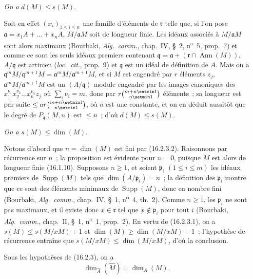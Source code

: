 \begin{env}[16.2.3.3]
\label{0.16.2.3.3-fr}
\emph{On a} $d(M)\leq s(M)$.
\end{env}

Soit en effet $(x_i)_{1\leq i\leq n}$ une famille d'éléments de
$\mathfrak{r}$ telle que, si l'on pose
$\mathfrak{a}=x_1A+\ldots+x_nA$, $M/\mathfrak{a}M$ soit de longueur finie.
Les idéaux associés à $M/\mathfrak{a}M$ sont alors maximaux (Bourbaki,
\emph{Alg.~comm.}, chap.~IV, \S~2, n\textsuperscript{o}~5, prop.~7) et comme ce sont les seuls
idéaux premiers contenant
$\mathfrak{q}=\mathfrak{a}+(\mathfrak{r}\cap\operatorname{Ann}(M))$,
$A/\mathfrak{q}$ est artinien (\emph{loc.~cit.}, prop.~9) et $\mathfrak{q}$
est un idéal de définition de $A$. Mais on a
$\mathfrak{q}^mM/\mathfrak{q}^{m+1}M=
\mathfrak{a}^mM/\mathfrak{a}^{m+1}M$, et si $M$ est engendré par $r$ éléments
$z_j$, $\mathfrak{a}^mM/\mathfrak{a}^{m+1}M$ est un $(A/\mathfrak{q})$-module
engendré par les images canoniques des
$x_1^{\nu_1}x_2^{\nu_2}\ldots x_n^{\nu_n}z_j$ où
$\sum_i\nu_i=m$, donc par $r\binom{m+n\setmin 1}{n\setmin 1}$ éléments~; sa longueur est
par suite $\leq ar\binom{m+n\setmin 1}{n\setmin 1}$, où $a$ est une constante, et on en
déduit aussitôt que le degré de $P_{\mathfrak{q}}(M,n)$ est $\leq n$~; d'où
$d(M)\leq s(M)$.

\begin{env}[16.2.3.4]
\label{0.16.2.3.4-fr}
\emph{On a} $s(M)\leq\dim(M)$.
\end{env}

Notons d'abord que $n=\dim(M)$ est fini par (16.2.3.2). Raisonnons par
récurrence sur $n$~; la proposition est évidente pour $n=0$, puisque $M$ est
alors de longueur finie (16.1.10). Supposons $n\geq1$, et soient
$\mathfrak{p}_i$ $(1\leq i\leq m)$ les idéaux premiers de
$\operatorname{Supp}(M)$ tels que $\dim(A/\mathfrak{p}_i)=n$~; la définition
des $\mathfrak{p}_i$ montre que ce sont des éléments minimaux de
$\operatorname{Supp}(M)$, donc en nombre fini (Bourbaki, \emph{Alg.~comm.},
chap.~IV, \S~1, n\textsuperscript{o}~4, th.~2). Comme $n\geq1$, les $\mathfrak{p}_i$ ne sont pas
maximaux, et il existe donc $x\in\mathfrak{r}$ tel que
$x\notin\mathfrak{p}_i$ pour tout $i$ (Bourbaki, \emph{Alg.~comm.}, chap.~II,
\S~1, n\textsuperscript{o}~1, prop.~2). En vertu de (16.2.3.1), on a
$s(M)\leq s(M/xM)+1$ et $\dim(M)\geq\dim(M/xM)+1$~; l'hypothèse de récurrence
entraîne que $s(M/xM)\leq\dim(M/xM)$, d'où la conclusion.

\begin{corollary}[16.2.4]
\label{0.16.2.4-fr}
Sous les hypothèses de \textup{(16.2.3)}, on a
\begin{equation}
\label{0.16.2.4.1-fr}
\tag{16.2.4.1}
  \dim_{\widehat{A}}(\widehat{M})=\dim_A(M).
\end{equation}
\end{corollary}

